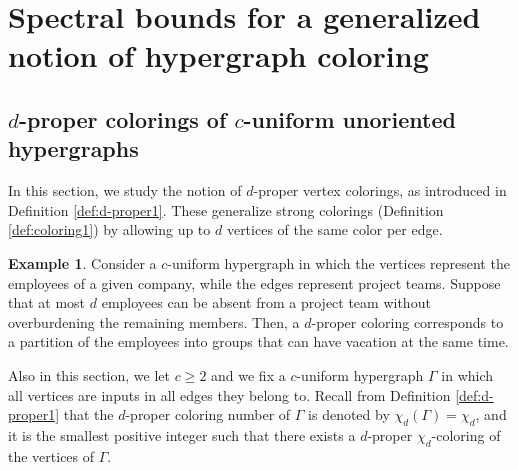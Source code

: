 \documentclass{article}
\theoremstyle{plain}
\theoremstyle{definition}
\newtheorem{definition}[theorem]{Definition}
\newtheorem{example}[theorem]{Example}
\theoremstyle{remark}
\begin{document}
\section{Spectral bounds for a generalized notion of hypergraph coloring}\label{sec:d-proper}
\subsection{\texorpdfstring{$d$}{d}-proper colorings of \texorpdfstring{$c$}{c}-uniform unoriented hypergraphs}


In this section, we study the notion of $d$-proper vertex colorings, as introduced in Definition \ref{def:d-proper1}. These generalize strong colorings (Definition \ref{def:coloring1}) by allowing up to $d$ vertices of the same color per edge.



\begin{example}\label{ex:d-proper}
    Consider a $c$-uniform hypergraph in which  the vertices represent the employees of a given company, while the edges represent project teams. Suppose that at most $d$ employees can be absent from a project team without overburdening the remaining members. Then, a $d$-proper coloring corresponds to a partition of the employees into groups that can have vacation at the same time.
\end{example}


Also in this section, we let $c\geq 2$ and we fix a $c$-uniform hypergraph $\Gamma$ in which all vertices are inputs in all edges they belong to. Recall from Definition \ref{def:d-proper1} that the $d$-proper coloring number of $\Gamma$ is denoted by $\chi_d(\Gamma)=\chi_d$, and it is the smallest positive integer such that there exists a $d$-proper $\chi_d$-coloring of the vertices of $\Gamma$.

\end{document}
